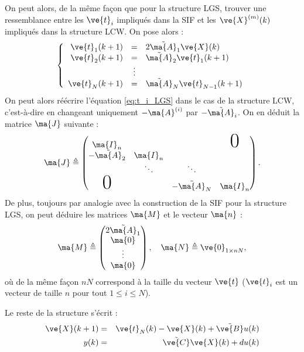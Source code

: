 On peut alors, de la même façon que pour la structure LGS, trouver une ressemblance entre les $\ve{t}_i$ impliqués dans la SIF et les $\ve{X}^{(m)}(k)$ impliqués dans la structure LCW. On pose alors :
\begin{equation*}
\left \{
\begin{array}{rcl}
\ve{t}_1(k+1) & = & 2\tilde{\ma{A}}_1\ve{X}(k)\\
\ve{t}_2(k+1) & = & \tilde{\ma{A}}_2\ve{t}_1(k+1) \\
 & \vdots &  \\
\ve{t}_N(k+1)& = & \tilde{\ma{A}}_{N}\ve{t}_{N-1}(k+1)\\
\end{array}
\right .
\end{equation*}
On peut alors réécrire l'équation \eqref{eq:t_i_LGS} dans le cas de la structure LCW, c'est-à-dire en changeant uniquement $-\ma{A}^{(i)}$ par $-\tilde{\ma{A}}_i$. On en déduit la matrice $\ma{J}$ suivante :
\begin{equation}
	\ma{J}\triangleq \begin{pmatrix}
		\ma{I}_n &  &  & \text{\Huge 0} \\
		-\tilde{\ma{A}}_2& \ma{I}_n & & \\
		  & \ddots & \ddots & \\
		\text{\Huge 0} &  & -\tilde{\ma{A}}_N & \ma{I}_n \\
	\end{pmatrix}.
\end{equation}
De plus, toujours par analogie avec la construction de la SIF pour la structure LGS, on peut déduire les matrices $\ma{M}$ et le vecteur $\ma{n}$ :
\begin{equation}
	\ma{M}\triangleq \begin{pmatrix}
		2\tilde{\ma{A}}_1\\
		\ma{0}\\
		\vdots\\
		\ma{0} \\
	\end{pmatrix}, \quad
	\ma{N}\triangleq \ve{0}_{1\times nN},
\end{equation}
où de la même façon $nN$ correspond à la taille du vecteur $\ve{t}$ ($\ve{t}_i$ est un vecteur de taille $n$ pour tout $1\leq i \leq N$).

Le reste de la structure s'écrit :
\begin{eqnarray}
	\ve{X}(k+1) &=&  \ve{t}_N(k)-\ve{X}(k)+\tilde{\ve{B}}u(k)\\
	y(k)&=&  \tilde{\ve{C}}\ve{X}(k)+du(k)
\end{eqnarray}


